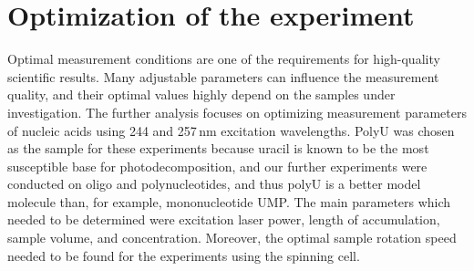 \section{Optimization of the experiment}

Optimal measurement conditions are one of the requirements for high-quality
scientific results.
Many adjustable parameters can influence the measurement quality, and their
optimal values highly depend on the samples under investigation.
The further analysis focuses on optimizing measurement parameters of nucleic
acids using 244 and 257\,nm excitation wavelengths.
PolyU was chosen as the sample for these experiments because uracil is known to
be the most susceptible base for photodecomposition, and our further
experiments were conducted on oligo and polynucleotides, and thus polyU is a
better model molecule than, for example, mononucleotide UMP.
The main parameters which needed to be determined were excitation laser power,
length of accumulation, sample volume, and concentration.
Moreover, the optimal sample rotation speed needed to be found for the
experiments using the spinning cell.







